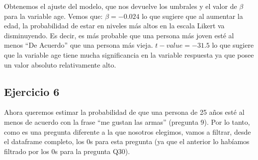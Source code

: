 \documentclass[
]{article}
\newenvironment{Shaded}{\begin{snugshade}}{\end{snugshade}}
\newcommand{\AttributeTok}[1]{\textcolor[rgb]{0.13,0.29,0.53}{#1}}
\newcommand{\CommentTok}[1]{\textcolor[rgb]{0.56,0.35,0.01}{\textit{#1}}}
\newcommand{\ConstantTok}[1]{\textcolor[rgb]{0.56,0.35,0.01}{#1}}
\newcommand{\DecValTok}[1]{\textcolor[rgb]{0.00,0.00,0.81}{#1}}
\newcommand{\FunctionTok}[1]{\textcolor[rgb]{0.13,0.29,0.53}{\textbf{#1}}}
\newcommand{\NormalTok}[1]{#1}
\newcommand{\OtherTok}[1]{\textcolor[rgb]{0.56,0.35,0.01}{#1}}
\newcommand{\SpecialCharTok}[1]{\textcolor[rgb]{0.81,0.36,0.00}{\textbf{#1}}}
\newcommand{\StringTok}[1]{\textcolor[rgb]{0.31,0.60,0.02}{#1}}
\begin{document}
Obtenemos el ajuste del modelo, que nos devuelve los umbrales y el valor
de \(\beta\) para la variable age. Vemos que: \(\beta = -0.024\) lo que
sugiere que al aumentar la edad, la probabilidad de estar en niveles más
altos en la escala Likert va disminuyendo. Es decir, es más probable que
una persona más joven esté al menos ``De Acuerdo'' que una persona más
vieja. \(t-value = -31.5\) lo que sugiere que la variable age tiene
mucha significancia en la variable respuesta ya que posee un valor
absoluto relativamente alto.

\subsection{Ejercicio 6}\label{ejercicio-6}

Ahora queremos estimar la probabilidad de que una persona de 25 años
esté al menos de acuerdo con la frase ``me gustan las armas'' (pregunta
9). Por lo tanto, como es una pregunta diferente a la que nosotros
elegimos, vamos a filtrar, desde el dataframe completo, los 0s para esta
pregunta (ya que el anterior lo habíamos filtrado por los 0s para la
pregunta Q30).

\begin{Shaded}
\end{Shaded}
\end{document}
